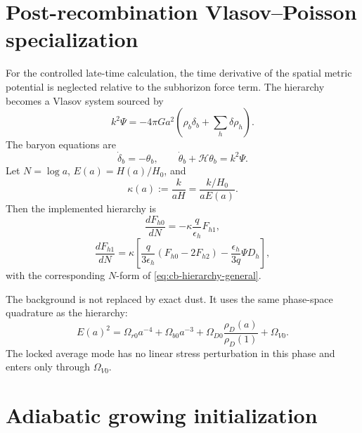 \section{Post-recombination Vlasov--Poisson specialization}

For the controlled late-time calculation, the time derivative of the spatial metric potential is neglected relative to the subhorizon force term.  The hierarchy becomes a Vlasov system sourced by
\begin{equation}
 k^2\Psi
 =-4\pi Ga^2
 \left(\rho_b\delta_b+\sum_h\delta\rho_h\right).
 \label{eq:cb-poisson}
\end{equation}
The baryon equations are
\begin{equation}
 \dot\delta_b=-\theta_b,
 \qquad
 \dot\theta_b+\mathcal H\theta_b=k^2\Psi.
 \label{eq:cb-baryon-fluid}
\end{equation}
Let $N=\log a$, $E(a)=H(a)/H_0$, and
\begin{equation}
 \kappa(a):=\frac{k}{aH}=\frac{k/H_0}{aE(a)}.
 \label{eq:cb-kappa}
\end{equation}
Then the implemented hierarchy is
\begin{equation}
 \frac{dF_{h0}}{dN}
 =-\kappa\frac{q}{\epsilon_h}F_{h1},
 \label{eq:cb-n-hierarchy-zero}
\end{equation}
\begin{equation}
 \frac{dF_{h1}}{dN}
 =\kappa
 \left[
 \frac{q}{3\epsilon_h}(F_{h0}-2F_{h2})
 -\frac{\epsilon_h}{3q}\Psi D_h
 \right],
 \label{eq:cb-n-hierarchy-one}
\end{equation}
with the corresponding $N$-form of \eqref{eq:cb-hierarchy-general}.

The background is not replaced by exact dust.  It uses the same phase-space quadrature as the hierarchy:
\begin{equation}
 E(a)^2
 =\Omega_{r0}a^{-4}
 +\Omega_{b0}a^{-3}
 +\Omega_{D0}\frac{\rho_D(a)}{\rho_D(1)}
 +\Omega_{V0}.
 \label{eq:cb-background-hubble}
\end{equation}
The locked average mode has no linear stress perturbation in this phase and enters only through $\Omega_{V0}$.

\section{Adiabatic growing initialization}

